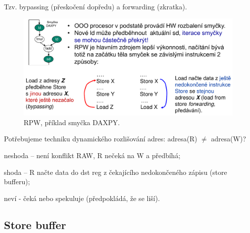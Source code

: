 \begin{compactitem}
    \item Tzv. bypassing (přeskočení dopředu) a forwarding (zkratka).
    \begin{figure}[H]
        \centering
        \includegraphics[width=1\linewidth]{rpw.pdf}
        \caption{RPW, příklad smyčka DAXPY.}
    \end{figure}

    \item Potřebujeme techniku dynamického rozlišování adres: adresa(R) $\not=$ adresa(W)?
    \item neshoda -- není konflikt RAW, R nečeká na W a předbíhá;
    \item shoda -- R načte data do dst reg z čekajícího nedokončeného zápisu (store bufferu);
    \item neví - čeká nebo spekuluje (předpokládá, že se liší).
\end{compactitem}

\subsection{Store buffer}

